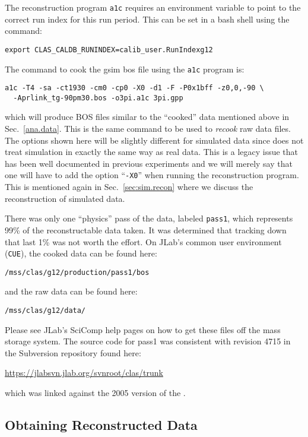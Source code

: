 The reconstruction program \texttt{a1c} requires an environment variable to point to the correct run index for this run period. This can be set in a bash shell using the command:
\begin{verbatim}
export CLAS_CALDB_RUNINDEX=calib_user.RunIndexg12
\end{verbatim}
The command to cook the gsim bos file using the \texttt{a1c} program is:
\begin{verbatim}
a1c -T4 -sa -ct1930 -cm0 -cp0 -X0 -d1 -F -P0x1bff -z0,0,-90 \
  -Aprlink_tg-90pm30.bos -o3pi.a1c 3pi.gpp
\end{verbatim}
which will produce BOS files similar to the ``cooked'' data mentioned above in Sec.~\ref{ana.data}. This is the same command to be used to \emph{recook} raw data files. The options shown here will be slightly different for simulated data since  does not treat simulation in exactly the same way as real data. This is a legacy issue that has been well documented in previous experiments and we will merely say that one will have to add the option ``\verb+-X0+'' when running the  reconstruction program. This is mentioned again in Sec.~\ref{sec:sim.recon} where we discuss the reconstruction of simulated data.

There was only one ``physics'' pass of the  data, labeled \texttt{pass1}, which represents 99\% of the reconstructable data taken. It was determined that tracking down that last 1\% was not worth the effort. On JLab's common user environment (\texttt{CUE}), the cooked data can be found here:
\begin{center}
    \texttt{/mss/clas/g12/production/pass1/bos}
\end{center}
and the raw data can be found here:
\begin{center}
    \texttt{/mss/clas/g12/data/}
\end{center}
Please see JLab's SciComp help pages on how to get these files off the mass storage system. The source code for pass1 was consistent with revision 4715 in the Subversion repository found here:
\begin{center}
    \url{https://jlabsvn.jlab.org/svnroot/clas/trunk}
\end{center}
which was linked against the 2005 version of the .

\FloatBarrier





\subsection{\label{sec:data.pass1}Obtaining Reconstructed Data}

